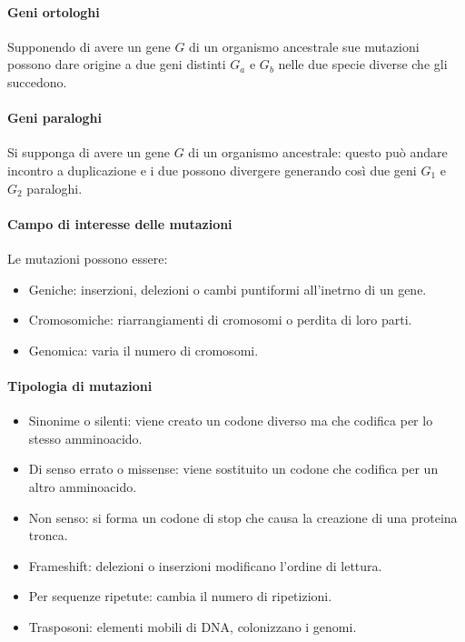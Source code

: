 \paragraph{Geni ortologhi}
Supponendo di avere un gene $G$ di un organismo ancestrale sue mutazioni possono dare origine a due geni distinti $G_a$ e $G_b$ nelle due specie diverse che gli succedono.
\paragraph{Geni paraloghi}
Si supponga di avere un gene $G$ di un organismo ancestrale: questo pu\`o andare incontro a duplicazione e i due possono divergere generando cos\`i due geni $G_1$ e $G_2$ paraloghi.

			\paragraph{Campo di interesse delle mutazioni}
			Le mutazioni possono essere:
			\begin{itemize}
				\item Geniche: inserzioni, delezioni o cambi puntiformi all'inetrno di un gene.
				\item Cromosomiche: riarrangiamenti di cromosomi o perdita di loro parti.
				\item Genomica: varia il numero di cromosomi.
			\end{itemize}

			\paragraph{Tipologia di mutazioni}
			\begin{multicols}{2}
				\begin{itemize}
					\item Sinonime o silenti: viene creato un codone diverso ma che codifica per lo stesso amminoacido.
					\item Di senso errato o missense: viene sostituito un codone che codifica per un altro amminoacido.
					\item Non senso: si forma un codone di stop che causa la creazione di una proteina tronca.
					\item Frameshift: delezioni o inserzioni modificano l'ordine di lettura.
					\item Per sequenze ripetute: cambia il numero di ripetizioni.
					\item Trasposoni: elementi mobili di DNA, colonizzano i genomi.
				\end{itemize}
			\end{multicols}
